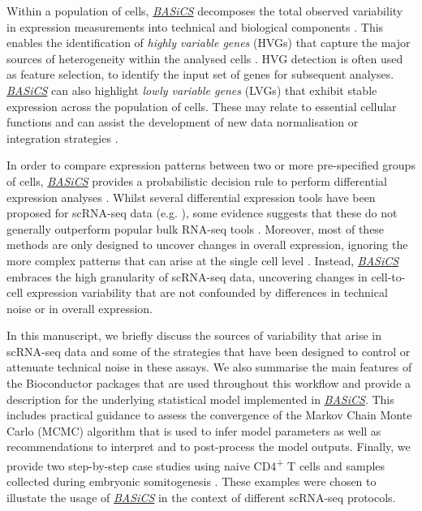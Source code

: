 \documentclass[9pt,a4paper,]{extarticle}
\begin{document}
Within a population of cells, \emph{\href{https://bioconductor.org/packages/3.11/BASiCS}{BASiCS}} decomposes the total
observed variability in expression measurements into technical and biological components \citep{Vallejos2015}.
This enables the identification of \emph{highly variable genes} (HVGs) that capture
the major sources of heterogeneity within the analysed cells \citep{Brennecke2013}.
HVG detection is often used as feature selection, to identify the input
set of genes for subsequent analyses.
\emph{\href{https://bioconductor.org/packages/3.11/BASiCS}{BASiCS}} can also highlight \emph{lowly variable genes} (LVGs) that
exhibit stable expression across the population of cells.
These may relate to essential cellular functions and can assist the development
of new data normalisation or integration strategies \citep{Lin2019}.

In order to compare expression patterns between two or more pre-specified
groups of cells, \emph{\href{https://bioconductor.org/packages/3.11/BASiCS}{BASiCS}} provides a probabilistic decision rule to
perform differential expression analyses \citep{Vallejos2016, Eling2018}.
Whilst several differential expression tools have been proposed for scRNA-seq
data (e.g. \citep{Kharchenko2014, Finak2015}), some evidence suggests that
these do not generally outperform popular bulk RNA-seq tools \citep{Soneson2018}.
Moreover, most of these methods are only designed to uncover changes in overall
expression, ignoring the more complex patterns that can arise at the single cell
level \citep{Lahnemann2020}.
Instead, \emph{\href{https://bioconductor.org/packages/3.11/BASiCS}{BASiCS}} embraces the high granularity of scRNA-seq data,
uncovering changes in cell-to-cell expression variability that are not
confounded by differences in technical noise or in overall expression.

In this manuscript, we briefly discuss the sources of variability that arise in
scRNA-seq data and some of the strategies that have been designed to control or
attenuate technical noise in these assays.
We also summarise the main features of the Bioconductor packages that are used
throughout this workflow and provide a description for the underlying statistical
model implemented in \emph{\href{https://bioconductor.org/packages/3.11/BASiCS}{BASiCS}}.
This includes practical guidance to assess the convergence of the Markov Chain
Monte Carlo (MCMC) algorithm that is used to infer model parameters as well as
recommendations to interpret and to post-process the model outputs.
Finally, we provide two step-by-step case studies using naive CD4\textsuperscript{+} T cells
\citep{Martinez-jimenez2017} and samples collected during embryonic somitogenesis
\citep{Ibarra-Soria2018}. These examples were chosen to illustate the usage of
\emph{\href{https://bioconductor.org/packages/3.11/BASiCS}{BASiCS}} in the context of different scRNA-seq protocols.
\end{document}
